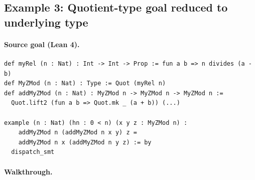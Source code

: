 \documentclass[11pt,letterpaper]{article}
\theoremstyle{definition}
\theoremstyle{remark}
\begin{document}
\subsection{Example 3: Quotient-type goal reduced to underlying type}
\label{sec:example3}

\paragraph{Source goal (Lean 4).}

\begin{lstlisting}[style=lean]
def myRel (n : Nat) : Int -> Int -> Prop := fun a b => n divides (a - b)
def MyZMod (n : Nat) : Type := Quot (myRel n)
def addMyZMod (n : Nat) : MyZMod n -> MyZMod n -> MyZMod n :=
  Quot.lift2 (fun a b => Quot.mk _ (a + b)) (...)

example (n : Nat) (hn : 0 < n) (x y z : MyZMod n) :
    addMyZMod n (addMyZMod n x y) z =
    addMyZMod n x (addMyZMod n y z) := by
  dispatch_smt
\end{lstlisting}

\paragraph{Walkthrough.}
\end{document}
